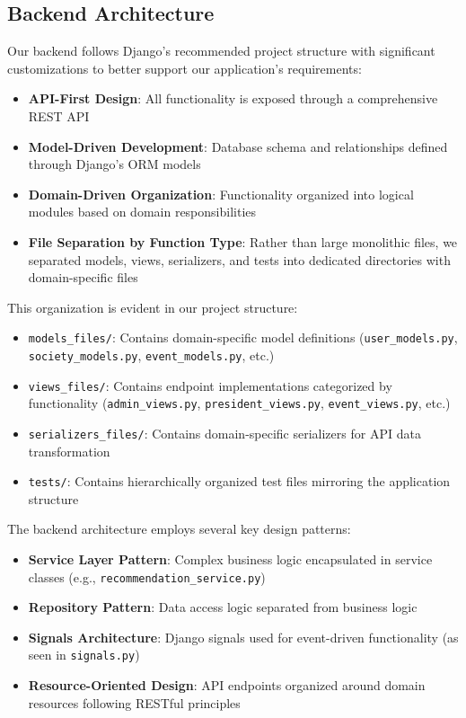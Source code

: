 \subsection{Backend Architecture}

Our backend follows Django's recommended project structure with significant customizations to better support our application's requirements:

\begin{itemize}
    \item \textbf{API-First Design}: All functionality is exposed through a comprehensive REST API
    \item \textbf{Model-Driven Development}: Database schema and relationships defined through Django's ORM models
    \item \textbf{Domain-Driven Organization}: Functionality organized into logical modules based on domain responsibilities
    \item \textbf{File Separation by Function Type}: Rather than large monolithic files, we separated models, views, serializers, and tests into dedicated directories with domain-specific files
\end{itemize}

This organization is evident in our project structure:

\begin{itemize}
    \item \texttt{models\_files/}: Contains domain-specific model definitions (\texttt{user\_models.py}, \texttt{society\_models.py}, \texttt{event\_models.py}, etc.)
    \item \texttt{views\_files/}: Contains endpoint implementations categorized by functionality (\texttt{admin\_views.py}, \texttt{president\_views.py}, \texttt{event\_views.py}, etc.)
    \item \texttt{serializers\_files/}: Contains domain-specific serializers for API data transformation
    \item \texttt{tests/}: Contains hierarchically organized test files mirroring the application structure
\end{itemize}

The backend architecture employs several key design patterns:

\begin{itemize}
    \item \textbf{Service Layer Pattern}: Complex business logic encapsulated in service classes (e.g., \texttt{recommendation\_service.py})
    \item \textbf{Repository Pattern}: Data access logic separated from business logic
    \item \textbf{Signals Architecture}: Django signals used for event-driven functionality (as seen in \texttt{signals.py})
    \item \textbf{Resource-Oriented Design}: API endpoints organized around domain resources following RESTful principles
\end{itemize}

